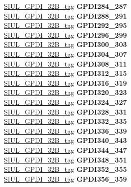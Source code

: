 \begin{DoxyCompactItemize}
\begin{tabbing}
\>\>\mbox{\hyperlink{unionSIUL__GPDI__32B__tag}{SIUL\_GPDI\_32B\_tag}} {\bfseries GPDI284\_287}\\
\>\>\mbox{\hyperlink{unionSIUL__GPDI__32B__tag}{SIUL\_GPDI\_32B\_tag}} {\bfseries GPDI288\_291}\\
\>\>\mbox{\hyperlink{unionSIUL__GPDI__32B__tag}{SIUL\_GPDI\_32B\_tag}} {\bfseries GPDI292\_295}\\
\>\>\mbox{\hyperlink{unionSIUL__GPDI__32B__tag}{SIUL\_GPDI\_32B\_tag}} {\bfseries GPDI296\_299}\\
\>\>\mbox{\hyperlink{unionSIUL__GPDI__32B__tag}{SIUL\_GPDI\_32B\_tag}} {\bfseries GPDI300\_303}\\
\>\>\mbox{\hyperlink{unionSIUL__GPDI__32B__tag}{SIUL\_GPDI\_32B\_tag}} {\bfseries GPDI304\_307}\\
\>\>\mbox{\hyperlink{unionSIUL__GPDI__32B__tag}{SIUL\_GPDI\_32B\_tag}} {\bfseries GPDI308\_311}\\
\>\>\mbox{\hyperlink{unionSIUL__GPDI__32B__tag}{SIUL\_GPDI\_32B\_tag}} {\bfseries GPDI312\_315}\\
\>\>\mbox{\hyperlink{unionSIUL__GPDI__32B__tag}{SIUL\_GPDI\_32B\_tag}} {\bfseries GPDI316\_319}\\
\>\>\mbox{\hyperlink{unionSIUL__GPDI__32B__tag}{SIUL\_GPDI\_32B\_tag}} {\bfseries GPDI320\_323}\\
\>\>\mbox{\hyperlink{unionSIUL__GPDI__32B__tag}{SIUL\_GPDI\_32B\_tag}} {\bfseries GPDI324\_327}\\
\>\>\mbox{\hyperlink{unionSIUL__GPDI__32B__tag}{SIUL\_GPDI\_32B\_tag}} {\bfseries GPDI328\_331}\\
\>\>\mbox{\hyperlink{unionSIUL__GPDI__32B__tag}{SIUL\_GPDI\_32B\_tag}} {\bfseries GPDI332\_335}\\
\>\>\mbox{\hyperlink{unionSIUL__GPDI__32B__tag}{SIUL\_GPDI\_32B\_tag}} {\bfseries GPDI336\_339}\\
\>\>\mbox{\hyperlink{unionSIUL__GPDI__32B__tag}{SIUL\_GPDI\_32B\_tag}} {\bfseries GPDI340\_343}\\
\>\>\mbox{\hyperlink{unionSIUL__GPDI__32B__tag}{SIUL\_GPDI\_32B\_tag}} {\bfseries GPDI344\_347}\\
\>\>\mbox{\hyperlink{unionSIUL__GPDI__32B__tag}{SIUL\_GPDI\_32B\_tag}} {\bfseries GPDI348\_351}\\
\>\>\mbox{\hyperlink{unionSIUL__GPDI__32B__tag}{SIUL\_GPDI\_32B\_tag}} {\bfseries GPDI352\_355}\\
\>\>\mbox{\hyperlink{unionSIUL__GPDI__32B__tag}{SIUL\_GPDI\_32B\_tag}} {\bfseries GPDI356\_359}\\

\end{tabbing}
\end{DoxyCompactItemize}
